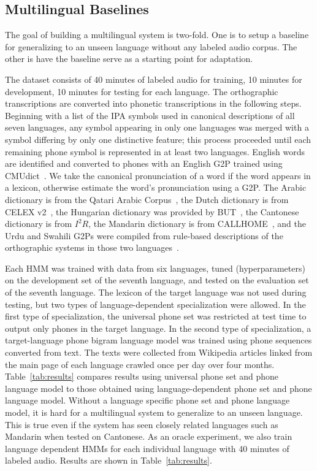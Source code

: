 \subsection{Multilingual Baselines}
\label{sec:mlbaseline}

The goal of building a multilingual system is two-fold.
One is to setup a baseline for generalizing to an unseen
language without any labeled audio corpus.  The other
is have the baseline serve as a starting point for
adaptation.

The dataset consists of 40 minutes of labeled audio for training,
10 minutes for development, 10 minutes for testing
for each language.
The orthographic transcriptions are converted into
phonetic transcriptions in the following steps.
Beginning with a list of the IPA symbols used in canonical descriptions
of all seven languages,
any symbol appearing in only one languages was merged with a symbol
differing by only one distinctive feature; this process proceeded until 
each remaining phone symbol is represented in at least two languages.
English words are identified and converted to phones with
an English G2P trained using CMUdict~\cite{Lenco15}.
We take the canonical pronunciation of a word if the word
appears in a lexicon,
otherwise estimate the word's pronunciation using a G2P.
The Arabic dictionary is from the Qatari Arabic Corpus~\cite{Elmahdy14},
the Dutch dictionary is from CELEX v2~\cite{Baayen96},
the Hungarian dictionary was provided by BUT~\cite{Grezl14},
the Cantonese dictionary is from $I^2R$,
the Mandarin dictionary is from CALLHOME~\cite{Canavan96},
and the Urdu and Swahili G2Ps were compiled from
rule-based descriptions of the orthographic systems in those
two languages~\cite{Hasegawajohnson15}.

Each HMM was trained with data from six languages, tuned
(hyperparameters) on the development set of the seventh language, and
tested on the evaluation set of the seventh language.  The lexicon of
the target language was not used during testing, but two types of
language-dependent specialization were allowed.  In the first type of
specialization, the universal phone set was restricted at test time to
output only phones in the target language.  In the second type of
specialization, a target-language phone bigram language model was
trained using phone sequences converted from text.  The texts were
collected from Wikipedia articles linked from the main page of each
language crawled once per day over four months.
Table~\ref{tab:results} compares results using universal phone set and
phone language model to those obtained using language-dependent phone
set and phone language model.  Without a language specific phone set
and phone language model, it is hard for a multilingual system to
generalize to an unseen language.  This is true even if the system has
seen closely related languages such as Mandarin when tested on
Cantonese.  As an oracle experiment, we also train language dependent
HMMs for each individual language with 40 minutes of labeled audio.
Results are shown in Table~\ref{tab:results}.

